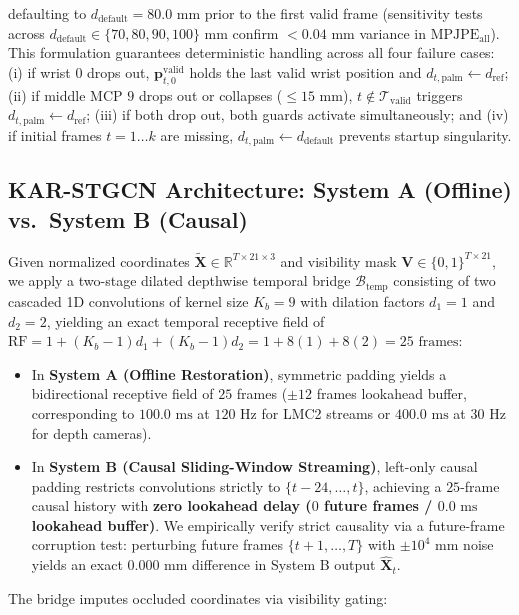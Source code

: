 \documentclass[10pt,twocolumn]{article}
\begin{document}
defaulting to $d_{\text{default}} = 80.0\text{ mm}$ prior to the first valid frame (sensitivity tests across $d_{\text{default}} \in \{70, 80, 90, 100\}\text{ mm}$ confirm $<0.04\text{ mm}$ variance in $\text{MPJPE}_{\text{all}}$). This formulation guarantees deterministic handling across all four failure cases: (i) if wrist $0$ drops out, $\mathbf{p}_{t,0}^{\text{valid}}$ holds the last valid wrist position and $d_{t,\text{palm}} \leftarrow d_{\text{ref}}$; (ii) if middle MCP $9$ drops out or collapses ($\le 15\text{ mm}$), $t \notin \mathcal{T}_{\text{valid}}$ triggers $d_{t,\text{palm}} \leftarrow d_{\text{ref}}$; (iii) if both drop out, both guards activate simultaneously; and (iv) if initial frames $t=1\dots k$ are missing, $d_{t,\text{palm}} \leftarrow d_{\text{default}}$ prevents startup singularity.

\subsection{KAR-STGCN Architecture: System A (Offline) vs.\ System B (Causal)}
Given normalized coordinates $\tilde{\mathbf{X}} \in \mathbb{R}^{T \times 21 \times 3}$ and visibility mask $\mathbf{V} \in \{0,1\}^{T \times 21}$, we apply a two-stage dilated depthwise temporal bridge $\mathcal{B}_{\text{temp}}$ consisting of two cascaded 1D convolutions of kernel size $K_b=9$ with dilation factors $d_1=1$ and $d_2=2$, yielding an exact temporal receptive field of $\text{RF} = 1 + (K_b-1)d_1 + (K_b-1)d_2 = 1 + 8(1) + 8(2) = 25\text{ frames}$:
\begin{itemize}
    \item In \textbf{System A (Offline Restoration)}, symmetric padding yields a bidirectional receptive field of $25$ frames ($\pm 12$ frames lookahead buffer, corresponding to $100.0\text{ ms}$ at $120\text{ Hz}$ for LMC2 streams or $400.0\text{ ms}$ at $30\text{ Hz}$ for depth cameras).
    \item In \textbf{System B (Causal Sliding-Window Streaming)}, left-only causal padding restricts convolutions strictly to $\{t-24, \dots, t\}$, achieving a $25$-frame causal history with \textbf{zero lookahead delay ($0$ future frames / $0.0\text{ ms}$ lookahead buffer)}. We empirically verify strict causality via a future-frame corruption test: perturbing future frames $\{t+1, \dots, T\}$ with $\pm 10^4\text{ mm}$ noise yields an exact $0.000\text{ mm}$ difference in System B output $\hat{\mathbf{X}}_t$.
\end{itemize}
The bridge imputes occluded coordinates via visibility gating:
\end{document}
